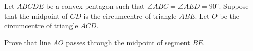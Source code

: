 Let $ABCDE$ be a convex pentagon such that $\angle ABC = \angle AED = 90^\circ$. Suppose that the midpoint of $CD$ is the circumcentre of triangle $ABE$. Let $O$ be the circumcentre of triangle $ACD$.

Prove that line $AO$ passes through the midpoint of segment $BE$.

